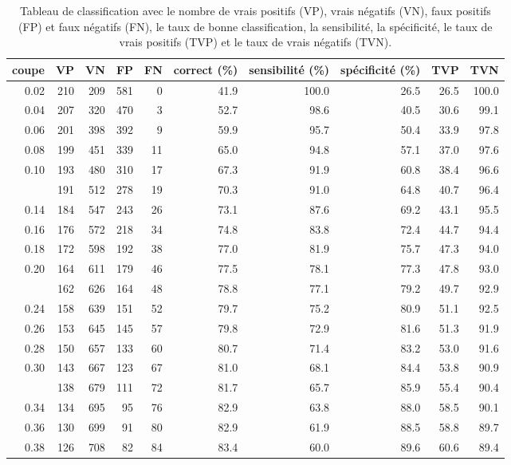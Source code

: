 \documentclass[
  11pt,
  letterpaper,
]{scrbook}
\theoremstyle{definition}
\theoremstyle{remark}
\begin{document}
\hypertarget{tbl-classification-loocv}{}
\begin{longtable}{rrrrrrrrrr}
\caption{\label{tbl-classification-loocv}Tableau de classification avec le nombre de vrais positifs (VP), vrais
négatifs (VN), faux positifs (FP) et faux négatifs (FN), le taux de
bonne classification, la sensibilité, la spécificité, le taux de vrais
positifs (TVP) et le taux de vrais négatifs (TVN). }\tabularnewline

\toprule
coupe & VP & VN & FP & FN & correct (\%) & sensibilité (\%) & spécificité (\%) & TVP & TVN\\
\midrule
0.02 & 210 & 209 & 581 & 0 & 41.9 & 100.0 & 26.5 & 26.5 & 100.0\\
0.04 & 207 & 320 & 470 & 3 & 52.7 & 98.6 & 40.5 & 30.6 & 99.1\\
0.06 & 201 & 398 & 392 & 9 & 59.9 & 95.7 & 50.4 & 33.9 & 97.8\\
0.08 & 199 & 451 & 339 & 11 & 65.0 & 94.8 & 57.1 & 37.0 & 97.6\\
0.10 & 193 & 480 & 310 & 17 & 67.3 & 91.9 & 60.8 & 38.4 & 96.6\\
\addlinespace
0.12 & 191 & 512 & 278 & 19 & 70.3 & 91.0 & 64.8 & 40.7 & 96.4\\
0.14 & 184 & 547 & 243 & 26 & 73.1 & 87.6 & 69.2 & 43.1 & 95.5\\
0.16 & 176 & 572 & 218 & 34 & 74.8 & 83.8 & 72.4 & 44.7 & 94.4\\
0.18 & 172 & 598 & 192 & 38 & 77.0 & 81.9 & 75.7 & 47.3 & 94.0\\
0.20 & 164 & 611 & 179 & 46 & 77.5 & 78.1 & 77.3 & 47.8 & 93.0\\
\addlinespace
0.22 & 162 & 626 & 164 & 48 & 78.8 & 77.1 & 79.2 & 49.7 & 92.9\\
0.24 & 158 & 639 & 151 & 52 & 79.7 & 75.2 & 80.9 & 51.1 & 92.5\\
0.26 & 153 & 645 & 145 & 57 & 79.8 & 72.9 & 81.6 & 51.3 & 91.9\\
0.28 & 150 & 657 & 133 & 60 & 80.7 & 71.4 & 83.2 & 53.0 & 91.6\\
0.30 & 143 & 667 & 123 & 67 & 81.0 & 68.1 & 84.4 & 53.8 & 90.9\\
\addlinespace
0.32 & 138 & 679 & 111 & 72 & 81.7 & 65.7 & 85.9 & 55.4 & 90.4\\
0.34 & 134 & 695 & 95 & 76 & 82.9 & 63.8 & 88.0 & 58.5 & 90.1\\
0.36 & 130 & 699 & 91 & 80 & 82.9 & 61.9 & 88.5 & 58.8 & 89.7\\
0.38 & 126 & 708 & 82 & 84 & 83.4 & 60.0 & 89.6 & 60.6 & 89.4\\

\end{longtable}
\end{document}

